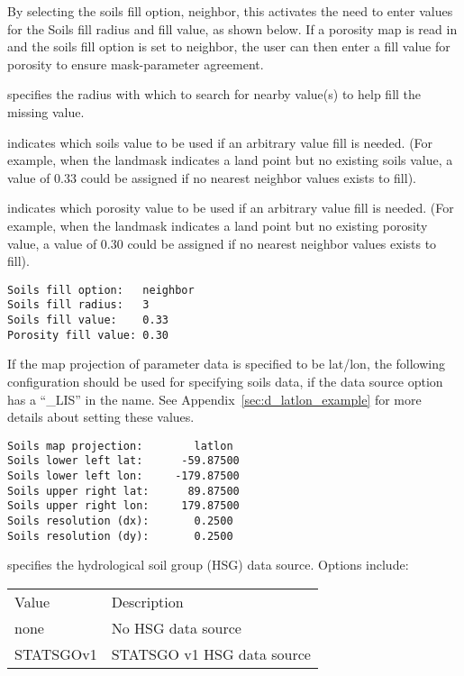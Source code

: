  By selecting the soils fill option, neighbor, this activates the
 need to enter values for the Soils fill radius and fill value, as
 shown below.  If a porosity map is read in and the soils fill option
 is set to neighbor, the user can then enter a fill value for porosity
 to ensure mask-parameter agreement. 

  specifies the radius with which
 to search for nearby value(s) to help fill the missing value.

  indicates which soils
 value to be used if an arbitrary value fill is needed. 
 (For example, when the landmask indicates a land point but no existing 
 soils value, a value of 0.33 could be assigned if 
 no nearest neighbor values exists to fill).

  indicates which porosity
 value to be used if an arbitrary value fill is needed. 
 (For example, when the landmask indicates a land point but no existing 
 porosity value, a value of 0.30 could be assigned if 
 no nearest neighbor values exists to fill).
 

 \begin{Verbatim}[frame=single]
Soils fill option:   neighbor 
Soils fill radius:   3
Soils fill value:    0.33
Porosity fill value: 0.30
 \end{Verbatim}

 
 If the map projection of parameter data is specified to be lat/lon,
 the following configuration should be used for specifying soils data,
 if the data source option has a ``\_LIS'' in the name.
 See Appendix~\ref{sec:d_latlon_example} for more details about
 setting these values.
 

 \begin{Verbatim}[frame=single]
Soils map projection:        latlon
Soils lower left lat:      -59.87500
Soils lower left lon:     -179.87500
Soils upper right lat:      89.87500
Soils upper right lon:     179.87500
Soils resolution (dx):       0.2500
Soils resolution (dy):       0.2500
 \end{Verbatim}

 
  specifies the 
 hydrological soil group (HSG) data source.
 Options include:

 \begin{tabular}{ll}
 Value   & Description                         \\
 none      & No HSG data source                \\
 STATSGOv1 & STATSGO v1 HSG data source        \\
 \end{tabular}
 

